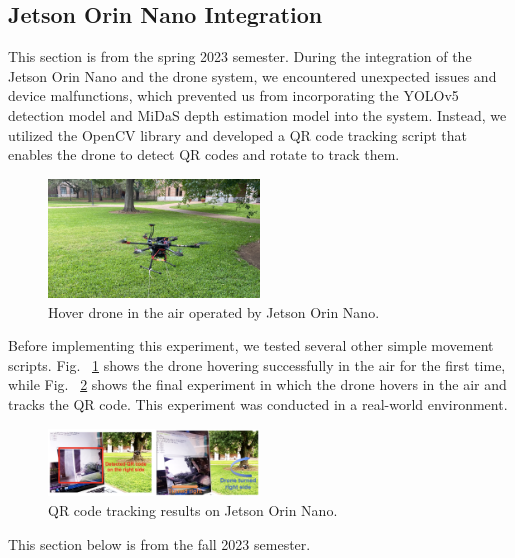 \subsection{Jetson Orin Nano Integration}

This section is from the spring 2023 semester. During the integration of the Jetson Orin Nano and the drone system, we encountered unexpected issues and device malfunctions, which prevented us from incorporating the YOLOv5 detection model and MiDaS depth estimation model into the system. Instead, we utilized the OpenCV library and developed a QR code tracking script that enables the drone to detect QR codes and rotate to track them. 

\begin{figure}[H]
    \centerline{\includegraphics[width=0.5\textwidth]{Figures/Results/Drone_Hover.JPG}}
    \caption{Hover drone in the air operated by Jetson Orin Nano.}
    \label{fig3b1}
\end{figure}

Before implementing this experiment, we tested several other simple movement scripts. Fig. ~\ref{fig3b1} shows the drone hovering successfully in the air for the first time, while Fig. ~\ref{fig3b2} shows the final experiment in which the drone hovers in the air and tracks the QR code. This experiment was conducted in a real-world environment.

\begin{figure}[H]
    \centerline{\includegraphics[width=0.5\textwidth]{Figures/Results/QR_code_Tracking_Successfully.png}}
    \caption{QR code tracking results on Jetson Orin Nano.}
    \label{fig3b2}
\end{figure}

This section below is from the fall 2023 semester.


